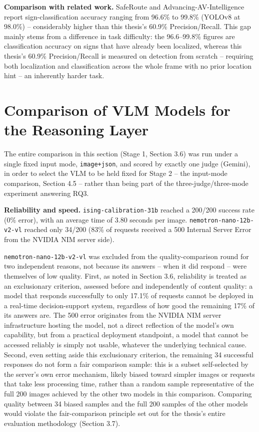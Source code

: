 \documentclass[12pt,a4paper]{report}
\begin{document}
\textbf{Comparison with related work.} SafeRoute and Advancing-AV-Intelligence \cite{shaw2025saferoute, sah2025advancing} report sign-classification accuracy ranging from 96.6\% to 99.8\% (YOLOv8 at 98.0\%) -- considerably higher than this thesis's 60.9\% Precision/Recall. This gap mainly stems from a difference in task difficulty: the 96.6--99.8\% figures are classification accuracy on signs that have already been localized, whereas this thesis's 60.9\% Precision/Recall is measured on detection from scratch -- requiring both localization and classification across the whole frame with no prior location hint -- an inherently harder task.

\section{Comparison of VLM Models for the Reasoning Layer}

The entire comparison in this section (Stage 1, Section 3.6) was run under a single fixed input mode, \texttt{image+json}, and scored by exactly one judge (Gemini), in order to select the VLM to be held fixed for Stage 2 -- the input-mode comparison, Section 4.5 -- rather than being part of the three-judge/three-mode experiment answering RQ3.

\textbf{Reliability and speed.} \texttt{ising-calibration-31b} reached a 200/200 success rate (0\% error), with an average time of 3.80 seconds per image. \texttt{nemotron-nano-12b-v2-vl} reached only 34/200 (83\% of requests received a 500 Internal Server Error from the NVIDIA NIM server side).

\texttt{nemotron-nano-12b-v2-vl} was excluded from the quality-comparison round for two independent reasons, not because its answers -- when it did respond -- were themselves of low quality. First, as noted in Section 3.6, reliability is treated as an exclusionary criterion, assessed before and independently of content quality: a model that responds successfully to only 17.1\% of requests cannot be deployed in a real-time decision-support system, regardless of how good the remaining 17\% of its answers are. The 500 error originates from the NVIDIA NIM server infrastructure hosting the model, not a direct reflection of the model's own capability, but from a practical deployment standpoint, a model that cannot be accessed reliably is simply not usable, whatever the underlying technical cause. Second, even setting aside this exclusionary criterion, the remaining 34 successful responses do not form a fair comparison sample: this is a subset self-selected by the server's own error mechanism, likely biased toward simpler images or requests that take less processing time, rather than a random sample representative of the full 200 images achieved by the other two models in this comparison. Comparing quality between 34 biased samples and the full 200 samples of the other models would violate the fair-comparison principle set out for the thesis's entire evaluation methodology (Section 3.7).
\end{document}
